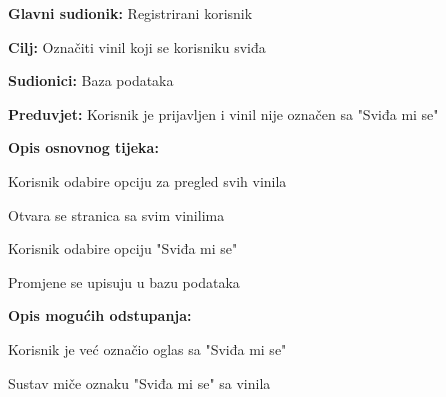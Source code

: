 					\noindent {}
					\begin{packed_item}
	
						\item \textbf{Glavni sudionik: }Registrirani korisnik
						\item  \textbf{Cilj:} Označiti vinil koji se korisniku sviđa
						\item  \textbf{Sudionici:} Baza podataka
						\item  \textbf{Preduvjet:} Korisnik je prijavljen i vinil nije označen sa "Sviđa mi se"
						\item  \textbf{Opis osnovnog tijeka:}
						
						\item[] \begin{packed_enum}
	
							\item Korisnik odabire opciju za pregled svih vinila
							\item Otvara se stranica sa svim vinilima
							\item Korisnik odabire opciju "Sviđa mi se"
							\item Promjene se upisuju u bazu podataka

						\end{packed_enum}		
						
						\item  \textbf{Opis mogućih odstupanja:}
						
						\item[] \begin{packed_item}
	
							\item[3.a] Korisnik je već označio oglas sa "Sviđa mi se"
								\begin{packed_item}
									\item Sustav miče oznaku "Sviđa mi se" sa vinila
								\end{packed_item}
								
						\end{packed_item}				
					\end{packed_item}
					
